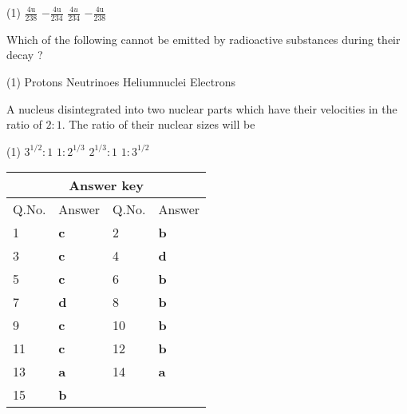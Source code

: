 \begin{enumerate}[ label=\color{ocre}\textbf{\arabic*.}]
\begin{minipage}{\textwidth}
\end{minipage}
\begin{tasks}(1)
	\task[\textbf{A.}] $\frac{4 \mathrm{u}}{238}$
	\task[\textbf{B.}] $-\frac{4 \mathrm{u}}{234}$
	\task[\textbf{C.}]$\frac{4 u}{234}$
	\task[\textbf{D.}]$-\frac{4 \mathrm{u}}{238}$
\end{tasks}
\begin{minipage}{\textwidth}
	\item Which of the following cannot be emitted by radioactive substances during their decay ?
\end{minipage}
\begin{tasks}(1)
	\task[\textbf{A.}] Protons
	\task[\textbf{B.}] Neutrinoes
	\task[\textbf{C.}]Heliumnuclei
	\task[\textbf{D.}] Electrons
\end{tasks}
\begin{minipage}{\textwidth}
	\item A nucleus disintegrated into two nuclear parts which have their velocities in the ratio of $2: 1$. The ratio of their nuclear sizes will be
\end{minipage}
\begin{tasks}(1)
	\task[\textbf{A.}]  $3^{1 / 2}: 1$
	\task[\textbf{B.}]  $1: 2^{1 / 3}$
	\task[\textbf{C.}]$2^{1 / 3}: 1$
	\task[\textbf{D.}]$1: 3^{1 / 2}$
\end{tasks}
\end{enumerate}
\setlength\arrayrulewidth{1pt}
\begin{table}[H]
	\centering
	
	\begin{tabular}{|p{1.5cm}|p{1.5cm}||p{1.5cm}|p{1.5cm}|}
		\hline
		\multicolumn{4}{|c|}{\textbf{Answer key}}\\\hline\hline
		\rowcolor{ocrel}Q.No.&Answer&Q.No.&Answer\\\hline
		1&\textbf{c}&2&\textbf{b}\\\hline
		3&\textbf{c}&4&\textbf{d}\\\hline
		5&\textbf{c}&6&\textbf{b}\\\hline
		7&\textbf{d}&8&\textbf{b}\\\hline
		9&\textbf{c}&10&\textbf{b}\\\hline
		11&\textbf{c}&12&\textbf{b}\\\hline
		13&\textbf{a}&14&\textbf{a}\\\hline
		15&\textbf{b}&&\\\hline
	\end{tabular}
\end{table}
